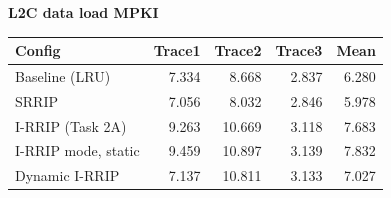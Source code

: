 \textbf{L2C data load MPKI}\\[2pt]
\begin{tabular}{lrrrr}\toprule
Config & Trace1 & Trace2 & Trace3 & Mean \\ \midrule
Baseline (LRU) & 7.334 & 8.668 & 2.837 & 6.280 \\
SRRIP & 7.056 & 8.032 & 2.846 & 5.978 \\
I-RRIP (Task 2A) & 9.263 & 10.669 & 3.118 & 7.683 \\
I-RRIP mode, static & 9.459 & 10.897 & 3.139 & 7.832 \\
Dynamic I-RRIP & 7.137 & 10.811 & 3.133 & 7.027 \\
\bottomrule\end{tabular}
\medskip
